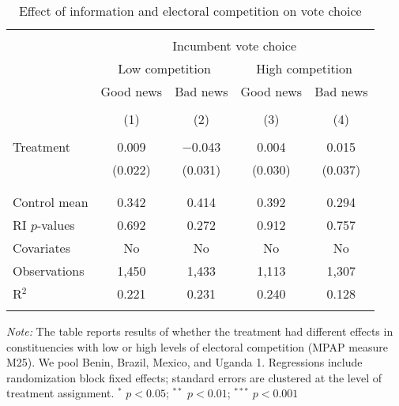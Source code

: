 
\begin{table}[!htbp] \centering 
  \caption{Effect of information and electoral competition on vote choice} 
  \label{competition} 
\begin{tabular}{@{\extracolsep{1pt}}lcccc} 
\\[-1.8ex]\hline 
\hline \\[-1.8ex] 
 & \multicolumn{4}{c}{Incumbent vote choice} \\ 
\cline{2-5} 
& \multicolumn{2}{c}{Low competition} &\multicolumn{2}{c}{High competition} \\
\cline{2-5}
 & Good news & Bad news & Good news & Bad news \\ 
\\[-1.8ex] & (1) & (2) & (3) & (4)\\ 
\hline \\[-1.8ex] 
 Treatment & 0.009 & $-$0.043 & 0.004 & 0.015 \\ 
  & (0.022) & (0.031) & (0.030) & (0.037) \\ 
  & & & & \\ 
\hline \\[-1.8ex] 
Control mean & 0.342 & 0.414 & 0.392 & 0.294 \\ 
RI $p$-values & 0.692 & 0.272 & 0.912 & 0.757 \\ 
Covariates & No & No & No & No \\ 
Observations & 1,450 & 1,433 & 1,113 & 1,307 \\ 
R$^{2}$ & 0.221 & 0.231 & 0.240 & 0.128 \\ 
\hline 
\hline \\[-1.8ex] 
\end{tabular} 
\begin{flushleft}\textit{Note:} The table reports results of whether the treatment had different effects in constituencies with low or high levels of electoral competition (MPAP measure M25). We pool Benin, Brazil, Mexico, and Uganda 1. Regressions include randomization block fixed effects; standard errors are clustered at the level of treatment assignment. $^*$ $p<0.05$; $^{**}$ $p<0.01$; $^{***}$ $p<0.001$ \end{flushleft}
\end{table} 

